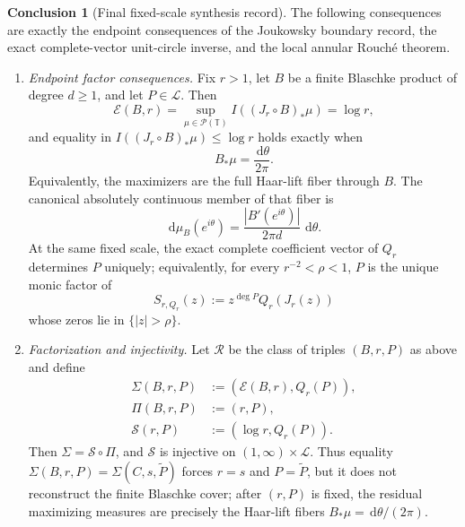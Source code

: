\documentclass[12pt,a4paper]{article}
\theoremstyle{plain}
\theoremstyle{definition}
\newtheorem{conclusion}[theorem]{Conclusion}
\numberwithin{equation}{section}
\newcommand{\TT}{\mathbb{T}}
\newcommand{\dd}{\,\mathrm{d}}
\begin{document}
\begin{conclusion}[Final fixed-scale synthesis record]\label{thm:fixed-scale-final-synthesis}\label{prop:endpoint-input-synthesis}\label{prop:scale-recognition-factorization}\label{cor:boundary-scale-rigidity}\label{prop:boundary-scale-certificate-map}\label{cor:stable-boundary-scale-recognition}\label{prop:boundary-scale-recognition-obstruction}\label{cor:capacity-mahler-fiber-classification}
The following consequences are exactly the endpoint consequences of the
Joukowsky boundary record, the exact complete-vector unit-circle inverse,
and the local annular Rouch\'e theorem.

\begin{enumerate}[label=\textup{(\alph*)},leftmargin=*]
\item \emph{Endpoint factor consequences.}
Fix \(r>1\), let \(B\) be a finite Blaschke product of degree \(d\ge1\),
and let \(P\in\mathcal L\).  Then
\[
\mathcal E(B,r)=\sup_{\mu\in\mathcal P(\TT)}
I((J_r\circ B)_\ast\mu)=\log r,
\]
and equality in \(I((J_r\circ B)_\ast\mu)\le\log r\) holds exactly when
\[
B_\ast\mu=\frac{\dd\theta}{2\pi}.
\]
Equivalently, the maximizers are the full Haar-lift fiber through \(B\).
The canonical absolutely continuous member of that fiber is
\[
\dd\mu_B(e^{i\theta})=\frac{|B'(e^{i\theta})|}{2\pi d}\,\dd\theta.
\]
At the same fixed scale, the exact complete coefficient vector of
\(Q_r\) determines \(P\) uniquely; equivalently, for every
\(r^{-2}<\rho<1\), \(P\) is the unique monic factor of
\[
S_{r,Q_r}(z):=z^{\deg P}Q_r(J_r(z))
\]
whose zeros lie in \(\{|z|>\rho\}\).

\item \emph{Factorization and injectivity.}
Let \(\mathcal R\) be the class of triples \((B,r,P)\) as above and define
\begin{align*}
\Sigma(B,r,P)&:=(\mathcal E(B,r),Q_r(P)),\\
\Pi(B,r,P)&:=(r,P),\\
\mathcal S(r,P)&:=(\log r,Q_r(P)).
\end{align*}
Then \(\Sigma=\mathcal S\circ\Pi\), and \(\mathcal S\) is injective on
\((1,\infty)\times\mathcal L\).  Thus equality
\(\Sigma(B,r,P)=\Sigma(C,s,\widetilde P)\) forces \(r=s\) and
\(P=\widetilde P\), but it does not reconstruct the finite Blaschke
cover; after \((r,P)\) is fixed, the residual maximizing measures are
precisely the Haar-lift fibers \(B_\ast\mu=\dd\theta/(2\pi)\).


\end{enumerate}
\end{conclusion}
\end{document}
